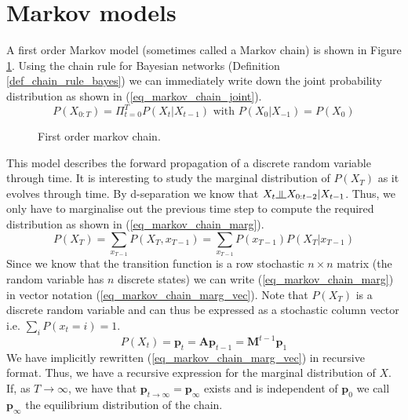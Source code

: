 \section{Markov models}
A first order Markov model (sometimes called a Markov chain) is shown in Figure \ref{fig_markov_chain}. Using the chain rule for Bayesian networks (Definition \ref{def_chain_rule_bayes}) we can immediately write down the joint probability distribution as shown in (\ref{eq_markov_chain_joint}).
\begin{equation}
P(X_{0:T}) = \Pi_{t=0}^T P(X_t|X_{t-1}) \text{ with } P(X_0|X_{-1}) = P(X_0)
\label{eq_markov_chain_joint}
\end{equation}  
\begin{figure}[H] 
\centering
{}
\caption{First order markov chain.}
\label{fig_markov_chain}
\end{figure}
This model describes the forward propagation of a discrete random variable through time. It is interesting to study the marginal distribution of $P(X_T)$ as it evolves through time. By d-separation we know that $X_t \indep X_{0:t-2} | X_{t-1}$. Thus, we only have to marginalise out the previous time step to compute the required distribution as shown in (\ref{eq_markov_chain_marg}).
\begin{equation}
P(X_T) = \sum_{x_{T-1}} P(X_T, x_{T-1}) = \sum_{x_{T-1}} P(x_{T-1})P(X_T|x_{T-1})
\label{eq_markov_chain_marg}
\end{equation}
Since we know that the transition function is a row stochastic $n \times n$ matrix (the random variable has $n$ discrete states) we can write (\ref{eq_markov_chain_marg}) in vector notation (\ref{eq_markov_chain_marg_vec}). Note that $P(X_T)$ is a discrete random variable and can thus be expressed as a stochastic column vector i.e. $\sum_i P(x_t=i) = 1$.
\begin{equation}
P(X_t) = \mathbf{p}_t = \mathbf{A}\mathbf{p}_{t-1} = \mathbf{M}^{t-1}\mathbf{p}_1
\label{eq_markov_chain_marg_vec}
\end{equation}
We have implicitly rewritten (\ref{eq_markov_chain_marg_vec}) in recursive format. Thus, we have a recursive expression for the marginal distribution of $X$. If, as $T \rightarrow \infty$, we have that $\mathbf{p}_{t \rightarrow \infty} = \mathbf{p}_{\infty}$ exists and is independent of $\mathbf{p}_0$ we call $\mathbf{p}_{\infty}$ the equilibrium distribution of the chain. 

